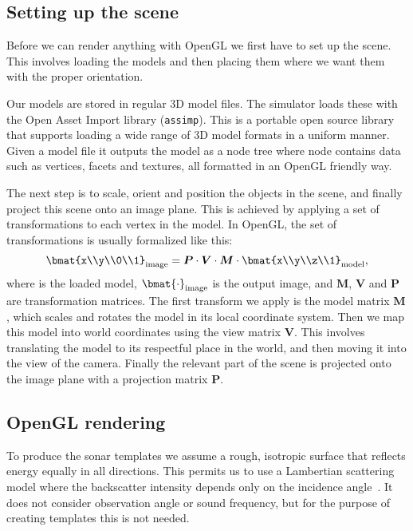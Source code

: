 \documentclass[
   UAM                                          %
 , 12pt                                         %
 , bibtex                                       %
 , layout
]{common/mytemplate}
\newcommand\mat[1]{\boldsymbol{#1}}
\renewcommand*\P{\mat P}
\newcommand*\V{\mat V}
\newcommand*\M{\mat M}
\begin{document}
\subsection{Setting up the scene}

Before we can render anything with OpenGL we first have to set up the scene. This involves loading the models and then placing them where we want them with the proper orientation. 

Our models are stored in regular 3D model files. The simulator loads these with the Open Asset Import library (\texttt{assimp}). This is a portable open source library that supports loading a wide range of 3D model formats in a uniform manner. Given a model file it outputs the model as a node tree where node contains data such as vertices, facets and textures, all formatted in an OpenGL friendly way.

The next step is to scale, orient and position the objects in the scene, and finally project this scene onto an image plane. This is achieved by applying a set of transformations to each vertex in the model. In OpenGL, the set of transformations is usually formalized like this:
\begin{align*}
\bmat{x\\y\\0\\1}_\text{image} = \P \cdot \V \cdot \M \cdot \bmat{x\\y\\z\\1}_\text{model},
\end{align*}
where is the loaded model, $\bmat{\cdot}_\text{image}$ is the output image, and $\M$, $\V$ and $\P$ are transformation matrices. The first transform we apply is the model matrix $\M$, which scales and rotates the model in its local coordinate system. Then we map this model into world coordinates using the view matrix $\V$. This involves translating the model to its respectful place in the world, and then moving it into the view of the camera. Finally the relevant part of the scene is projected onto the image plane with a projection matrix $\P$. 

\subsection{OpenGL rendering}

To produce the sonar templates we assume a rough, isotropic surface that reflects energy equally in all directions. This permits us to use a Lambertian scattering model where the backscatter intensity depends only on the incidence angle~\cite{Zhang1999}. It does not consider observation angle or sound frequency, but for the purpose of creating templates this is not needed.   
\end{document}
